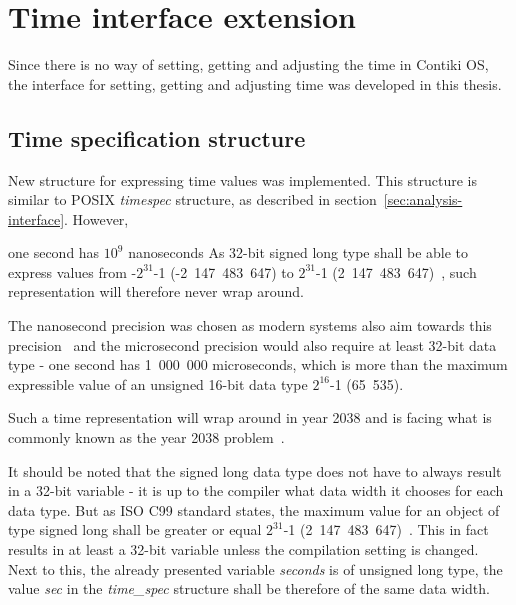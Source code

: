 
\section{Time interface extension}
Since there is no way of setting, getting and adjusting the time in Contiki OS,
the interface for setting, getting and adjusting time was developed in this thesis.


\subsection{Time specification structure}
New structure for expressing time values was implemented.
This structure is similar to POSIX {\it{timespec}} structure,
as described in section~\ref{sec:analysis-interface}.
However,



one second has $10^9$ nanoseconds
As 32-bit signed long type shall be able to express values from -$2^{31}$-1 (-2~147~483~647)
to $2^{31}$-1 (2~147~483~647)~\cite{c99},
such representation will therefore never wrap around.


The nanosecond precision was chosen as modern systems also aim towards this
precision~\cite{posix,ntp-precision} and
the microsecond precision would also require at least 32-bit data type -
one second has 1~000~000 microseconds, which is more than the maximum expressible value of
an unsigned 16-bit data type $2^{16}$-1 (65~535).


Such a time representation will wrap around in year 2038 and is facing
what is commonly known as the year 2038 problem~\cite{posix}.



It should be noted that the signed long data type does not have to always result in a 32-bit variable -
it is up to the compiler what data width it chooses for each data type.
But as ISO C99 standard states, the maximum value for an object of type signed long
shall be greater or equal $2^{31}$-1 (2~147~483~647)~\cite{c99}.
This in fact results in at least a 32-bit variable unless the compilation setting is changed.
Next to this, the already presented variable {\it{seconds}} is of unsigned long type,
the value {\it{sec}} in the {\it{time\_spec}} structure %
shall be therefore of the same data width.

